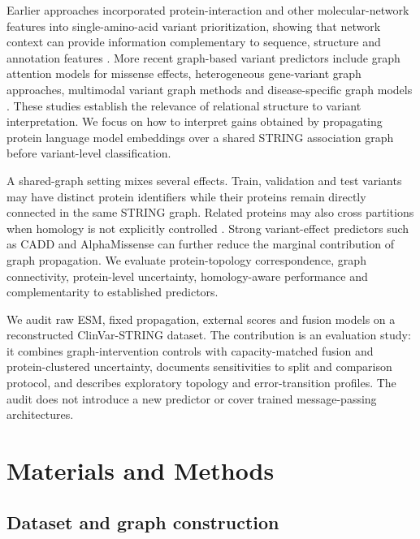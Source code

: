 \documentclass[conference]{IEEEtran}
\begin{document}
Earlier approaches incorporated protein-interaction and other molecular-network features into single-amino-acid variant prioritization, showing that network context can provide information complementary to sequence, structure and annotation features \cite{Yates2014SuSPect,Ozturk2022NetworkFeatures}. More recent graph-based variant predictors include graph attention models for missense effects, heterogeneous gene-variant graph approaches, multimodal variant graph methods and disease-specific graph models \cite{Zhang2022gMVP,Cheng2021VEGN,Yu2025GNNMAP,Ghadie2025DiseaseSpecificGNN}. These studies establish the relevance of relational structure to variant interpretation. We focus on how to interpret gains obtained by propagating protein language model embeddings over a shared STRING association graph before variant-level classification.

A shared-graph setting mixes several effects. Train, validation and test variants may have distinct protein identifiers while their proteins remain directly connected in the same STRING graph. Related proteins may also cross partitions when homology is not explicitly controlled \cite{Littmann2022ProteinMLTips,Teufel2023GraphPart}. Strong variant-effect predictors such as CADD and AlphaMissense can further reduce the marginal contribution of graph propagation. We evaluate protein-topology correspondence, graph connectivity, protein-level uncertainty, homology-aware performance and complementarity to established predictors.

We audit raw ESM, fixed propagation, external scores and fusion models on a reconstructed ClinVar-STRING dataset. The contribution is an evaluation study: it combines graph-intervention controls with capacity-matched fusion and protein-clustered uncertainty, documents sensitivities to split and comparison protocol, and describes exploratory topology and error-transition profiles. The audit does not introduce a new predictor or cover trained message-passing architectures.

\section{Materials and Methods}

\subsection{Dataset and graph construction}
\end{document}
